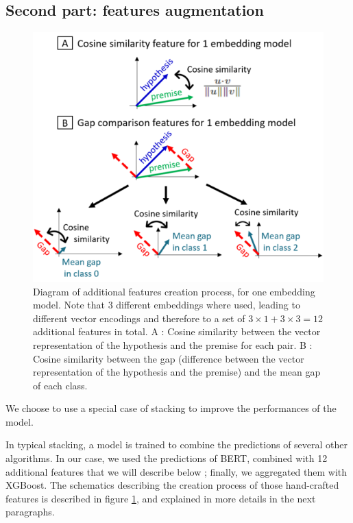 \documentclass[final]{cvpr}
\begin{document}
\subsection{Second part: features augmentation} \label{sec:otherFeatures}

\begin{figure}[ht]
	\centering
	\includegraphics[width=\columnwidth]{figures/features_creation.png}
	\caption{Diagram of additional features creation process, for one embedding model. Note that 3 different embeddings where used, leading to different vector encodings and therefore to a set of $3 \times 1 + 3 \times 3 = 12$ additional features in total. A : Cosine similarity between the vector representation of the hypothesis and the premise for each pair. B : Cosine similarity between the gap (difference between the vector representation of the hypothesis and the premise) and the mean gap of each class.}
    \label{features_creation}
\end{figure}

We choose to use a special case of stacking to improve the performances of the model.

In typical stacking, a model is trained to combine the predictions of several other algorithms. In our case, we used the predictions of BERT, combined with 12 additional features that we will describe below ; finally,  we aggregated them with XGBoost. The schematics describing the creation process of those hand-crafted features is described in figure \ref{features_creation}, and explained in more details in the next paragraphs.
\end{document}
